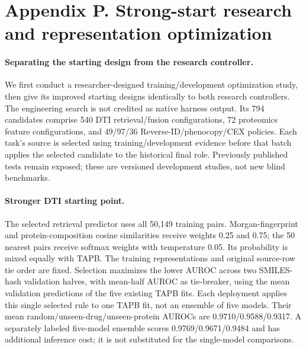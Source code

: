 \section*{Appendix P. Strong-start research and representation optimization}
\label{app:strong-start}
\renewcommand{\thetable}{P.\arabic{table}}
\renewcommand{\theHtable}{P.\arabic{table}}
\setcounter{table}{0}

\paragraph{Separating the starting design from the research controller.}
We first conduct a researcher-designed training/development optimization study, then give its improved starting designs identically to both research controllers. The engineering search is not credited as native harness output. Its 794 candidates comprise 540 DTI retrieval/fusion configurations, 72 proteomics feature configurations, and 49/97/36 Reverse-ID/phenocopy/CEX policies. Each task's source is selected using training/development evidence before that batch applies the selected candidate to the historical final role. Previously published tests remain exposed; these are versioned development studies, not new blind benchmarks.

\paragraph{Stronger DTI starting point.}
The selected retrieval predictor uses all 50,149 training pairs. Morgan-fingerprint and protein-composition cosine similarities receive weights 0.25 and 0.75; the 50 nearest pairs receive softmax weights with temperature 0.05. Its probability is mixed equally with TAPB. The training representations and original source-row tie order are fixed. Selection maximizes the lower AUROC across two SMILES-hash validation halves, with mean-half AUROC as tie-breaker, using the mean validation predictions of the five existing TAPB fits. Each deployment applies this single selected rule to one TAPB fit, not an ensemble of five models. Their mean random/unseen-drug/unseen-protein AUROCs are 0.9710/0.9588/0.9317. A separately labeled five-model ensemble scores 0.9769/0.9671/0.9484 and has additional inference cost; it is not substituted for the single-model comparisons.


